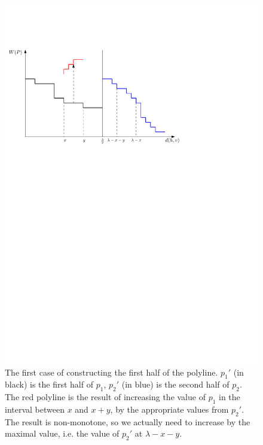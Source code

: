 \documentclass[11pt,a4paper]{article}
\theoremstyle{definition}
\theoremstyle{remark}
\begin{document}
\begin{enumerate}
\begin{figure}[h]
\begin{center}
\includegraphics{polyline_first_half_construction_case1}
\end{center}
\caption{The first case of constructing the first half of the polyline. $p_1'$ (in black) is the first half of $p_1$, $p_2'$ (in blue) is the second half of $p_2$. The red polyline is the result of increasing the value of $p_1$ in the interval between $x$ and $x+y$, by the appropriate values from $p_2'$. The result is non-monotone, so we actually need to increase by the maximal value, i.e. the value of $p_2'$ at $\lambda-x-y$. 
\label{figure of constructing the first half of the polyline case 1}}
\end{figure}



\end{enumerate}
\end{document}
